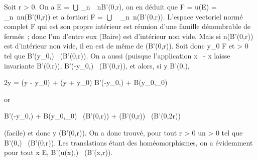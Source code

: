 \documentclass[]{article}
\begin{document}
Soit r \textgreater{} 0. On a E =  \_n\in{}~~nB'(0,r), on en déduit que F =
u(E) = \⋃ ~
\_n\in{}~nu(B'(0,r)) et a fortiori F =\
⋃ ~
\_n\in\mathbb{N}~n\overlineu(B'(0,r)). L'espace vectoriel
normé complet F qui est son propre intérieur est réunion d'une famille
dénombrable de fermés~; donc l'un d'entre eux (Baire) est d'intérieur
non vide. Mais si n\overlineu(B'(0,r)) est
d'intérieur non vide, il en est de même de
\overlineu(B'(0,r)). Soit donc y\_0 \in F et \rho
\textgreater{} 0 tel que B'(y\_0,\rho)
\subset~\overlineu(B'(0,r)). On a aussi (puisque
l'application x\mapsto~ - x laisse invariante
B'(0,r)), B'(-y\_0,\rho) \subset~\overlineu(B'(0,r)),
et alors, si y \in B'(0,\rho),

2y = (y - y\_0) + (y + y\_0) \in B'(-y\_0,\rho) +
B(y\_0,\rho\_0)

or

B'(-y\_0,\rho) + B(y\_0,\rho\_0)
\subset~\overlineu(B'(0,r)) +
\overlineu(B'(0,r))
\subset~\overlineu(B'(0,2r))

(facile) et donc y \in\overlineu(B'(0,r)). On a donc
trouvé, pour tout r \textgreater{} 0 un \rho \textgreater{} 0 tel que
B'(0,\rho) \subset~\overlineu(B'(0,r)). Les translations étant
des homéomorphismes, on a évidemment pour tout x \in E, B'(u(x),\rho)
\subset~\overlineu(B'(x,r)).
\end{document}
